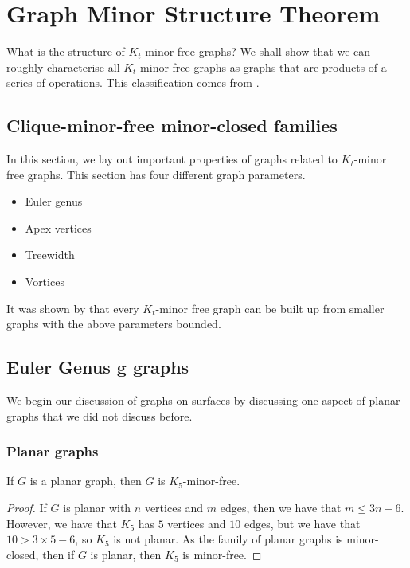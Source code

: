 
\section{Graph Minor Structure Theorem}\label{sec:Kt_Minor_Free}
What is the structure of \(K_t\)-minor free graphs? We shall show that we can roughly characterise all \(K_t\)-minor free graphs as graphs that are products of a series of operations. This classification comes from \cite{robertsonGraphMinorsXVI2003}.
\subsection{Clique-minor-free minor-closed families}\label{ssec:Kt_Minor_Closed_families}
In this section, we lay out important properties of graphs related to \(K_t\)-minor free graphs. This section has four different graph parameters.
\begin{itemize}
	\item Euler genus
	\item Apex vertices
	\item Treewidth
	\item Vortices
\end{itemize}
It was shown by \textcite{robertsonGraphMinorsXX2004} that every \(K_t\)-minor free graph can be built up from smaller graphs with the above parameters bounded.
\subsection{Euler Genus g graphs}
We begin our discussion of graphs on surfaces by discussing one aspect of planar graphs that we did not discuss before. 
\subsubsection{Planar graphs}\label{sssec:K_5-free_Planar}
\begin{theorem}\label{thm:K5_Free_Planar}
	If \(G\) is a planar graph, then \(G\) is \(K_5\)-minor-free.
\end{theorem}
\begin{proof}
	If \(G\) is planar with \(n\) vertices and \(m\) edges, then we have that \(m \leq 3n -6\). However, we have that \(K_5\) has \(5\) vertices and \(10\) edges, but we have that \( 10 > 3 \times 5 - 6\), so \(K_5\) is not planar. As the family of planar graphs is minor-closed, then if \(G\) is planar, then \(K_5\) is minor-free.
\end{proof}

